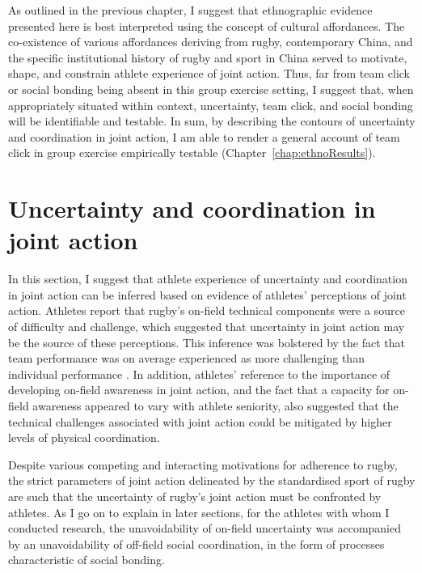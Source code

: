 \begin{CJK}{UTF8}{gbsn}
As outlined in the previous chapter, I suggest that ethnographic evidence presented here is best interpreted using the concept of cultural affordances.  The co-existence of various affordances deriving from rugby, contemporary China, and the specific institutional history of rugby and sport in China served to motivate, shape, and constrain athlete experience of joint action.  Thus, far from team click or social bonding being absent in this group exercise setting, I suggest that, when appropriately situated within context, uncertainty, team click, and social bonding will be identifiable and testable.  In sum, by describing the contours of uncertainty and coordination in joint action, I am able to render a general account of team click in group exercise empirically testable (Chapter~\ref{chap:ethnoResults}).




\section{Uncertainty and coordination in joint action\label{sect:uncertaintyJA}}
In this section, I suggest that athlete experience of uncertainty and coordination in joint action can be inferred based on evidence of athletes' perceptions of joint action.  Athletes report that rugby's on-field technical components were a source of difficulty and challenge, which suggested that uncertainty in joint action may be the source of these perceptions.  This inference was bolstered by the fact that team performance was on average experienced as more challenging than individual performance \citep[under the assumption that team performance entails higher levels of uncertainty than individual performance, see:][]{Fusaroli2014}.  In addition, athletes' reference to the importance of developing on-field awareness in joint action, and the fact that a capacity for on-field awareness appeared to vary with athlete seniority, also suggested that the technical challenges associated with joint action could be mitigated by higher levels of physical coordination.

Despite various competing and interacting motivations for adherence to rugby, the strict parameters of joint action delineated by the standardised sport of rugby are such that the uncertainty of rugby's joint action must be confronted by athletes.  As I go on to explain in later sections, for the athletes with whom I conducted research, the unavoidability of on-field uncertainty was accompanied by an unavoidability of off-field social coordination, in the form of processes characteristic of social bonding.


\end{CJK}
